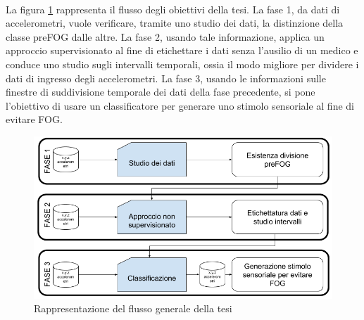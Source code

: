 \\ La figura \ref{FlussoTesiGenerale} rappresenta il flusso degli obiettivi della tesi. La fase 1, da dati di accelerometri, vuole verificare, tramite uno studio dei dati, la distinzione della classe preFOG dalle altre. 
La fase 2, usando tale informazione, applica un approccio supervisionato al fine di etichettare i dati senza l'ausilio di un medico e conduce uno studio sugli intervalli temporali, ossia il modo migliore per dividere i dati di ingresso degli accelerometri. La fase 3, usando le informazioni sulle finestre di suddivisione temporale dei dati della fase precedente, si pone l'obiettivo di usare un classificatore per generare uno stimolo sensoriale al fine di evitare FOG.
\begin{figure}[]
	\centering
	\includegraphics[width=1\textwidth]{images/FlussoTesiGenerale.png}
	\caption{Rappresentazione del flusso generale della tesi}
	\label{FlussoTesiGenerale}
\end{figure}
